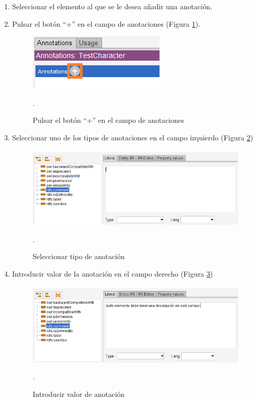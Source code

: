 \begin{enumerate}
    \item Seleccionar el elemento al que se le desea añadir una anotación.
    \item Pulsar el botón “+” en el campo de anotaciones (Figura \ref*{annotation_1}).
    \begin{figure}[H]
        \centering
        \includegraphics[scale=0.6]{Figures/Protege/Annotations.png}
        \caption{Pulsar el botón “+” en el campo de anotaciones}.
        \label{annotation_1}
    \end{figure}
\newpage
    \item Seleccionar uno de los tipos de anotaciones en el campo izquierdo (Figura \ref*{annotation_2})
    \begin{figure}[H]
        \centering
        \includegraphics[scale=0.6]{Figures/Protege/Annotations_1.png}
        \caption{Seleccionar tipo de anotación}.
        \label{annotation_2}
    \end{figure}

    \item Introducir valor de la anotación en el campo derecho (Figura \ref*{annotation_3})
    \begin{figure}[H]
        \centering
        \includegraphics[scale=0.6]{Figures/Protege/Annotations_2.png}
        \caption{Introducir valor de anotación}.
        \label{annotation_3}
    \end{figure}


\end{enumerate}
